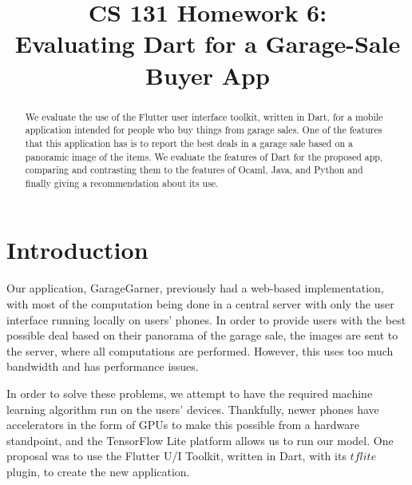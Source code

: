 
\date{}

\title{\Large \bf CS 131 Homework 6:\\
Evaluating Dart for a Garage-Sale Buyer App}

\maketitle

\begin{abstract}
We evaluate the use of the Flutter user interface toolkit, written in Dart, for a mobile application
intended for people who buy things from garage sales. One of the features that this application
has is to report the best deals in a garage sale based on a panoramic image of the items. We evaluate
the features of Dart for the proposed app, comparing and contrasting them to the features of 
Ocaml, Java, and Python and finally giving a recommendation about its use. 
\end{abstract}

\section{Introduction}
Our application, GarageGarner, previously had a web-based implementation, with most of the computation 
being done in a central server with only the user interface running locally on users' phones. 
In order to provide users with the best possible deal based on their panorama of the garage sale, 
the images are sent to the server, where all computations are performed. However, this uses too much bandwidth 
and has performance issues. 

In order to solve these problems, we attempt to have the required machine learning algorithm run on the users' devices. 
Thankfully, newer phones have accelerators in the form of GPUs to make this possible from a hardware standpoint, and the TensorFlow Lite platform allows us to run our model.
One proposal was to use the Flutter U/I Toolkit, written in Dart, with its $tflite$ plugin, to create the new application. 

